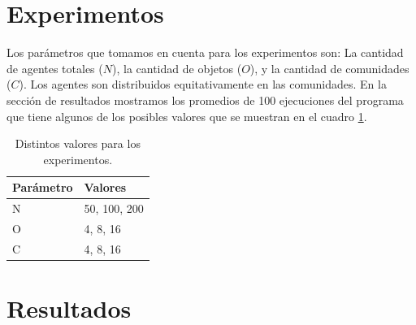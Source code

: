 \documentclass[runningheads]{llncs}
\begin{document}
\section{Experimentos}
Los parámetros que tomamos en cuenta para los experimentos son: La cantidad de agentes totales ($N$), la cantidad de objetos ($O$), y la cantidad de comunidades ($C$). Los agentes son distribuidos equitativamente en las comunidades. En la sección de resultados mostramos los promedios de 100 ejecuciones del programa que tiene algunos de los posibles valores que se muestran en el cuadro \ref{tab0}. 
\begin{table}[h]
	\centering
	\caption{Distintos valores para los experimentos.}\label{tab0}
	\begin{tabular}{|l|l|}
		\hline
		Parámetro &  Valores  \\
		\hline
		N &  50, 100, 200 \\
		\hline
		O &  4, 8, 16 \\
		\hline
		C &  4, 8, 16 \\
		\hline
	\end{tabular}
\end{table}
\section{Resultados}
\end{document}
